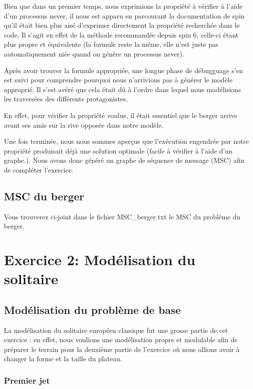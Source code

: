 \documentclass[12pt, a4paper]{report}
\begin{document}
Bien que dans un premier temps, nous exprimions la propriété à vérifier à l'aide d'un processus never, il nous est apparu en parcourant la documentation de spin qu'il était bien plus aisé d'exprimer directement la propriété recherchée dans le code. Il s'agit en effet de la méthode recommandée depuis spin 6, celle-ci étant plus propre et équivalente (la formule reste la même, elle n'est juste pas automatiquement niée quand on génère un processus never).

Après avoir trouver la formule appropriée, une longue phase de débugguage s'en est suivi pour comprendre pourquoi nous n'arrivions pas à générer le modèle approprié. Il s'est avéré que cela était dû à l'ordre dans lequel nous modélisions les traversées des différents protagonistes.

En effet, pour vérifier la propriété voulue, il était essentiel que le berger arrive avant ses amis sur la rive opposée dans notre modèle.

Une fois terminée, nous nous sommes aperçus que l'exécution engendrée par notre propriété produisait déjà une solution optimale (facile à vérifier à l'aide d'un graphe.). Nous avons donc généré un graphe de séquence de message (MSC) afin de compléter l'exercice.

\subsection{MSC du berger}

Vous trouverez ci-joint dans le fichier MSC\_berger.txt le MSC du problème du berger.

\section{Exercice 2: Modélisation du solitaire}

\subsection{Modélisation du problème de base}

La modélisation du solitaire européen classique fut une grosse partie de cet exercice : en effet, nous voulions une modélisation propre et modulable afin de préparer le terrain pour la deuxième partie de l'exercice où nous allions avoir à changer la forme et la taille du plateau.

\subsubsection{Premier jet}
\end{document}
